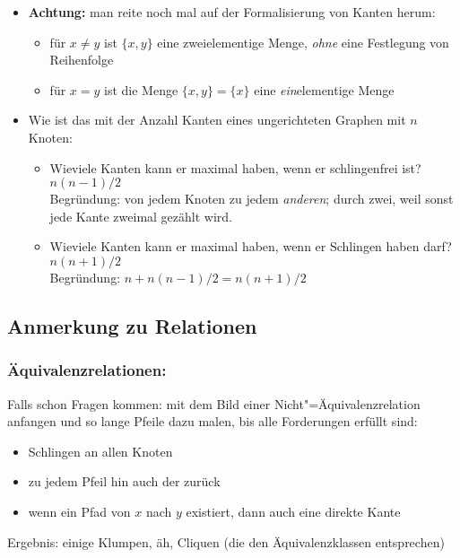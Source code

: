 \documentclass[12pt]{article}
\theoremstyle{margin}
\theoremstyle{margin}
\begin{document}
  \begin{itemize}
  \item \textbf{Achtung:} man reite noch mal auf der Formalisierung
    von Kanten herum:
    \begin{itemize}
    \item für $x\not=y$ ist $\{x,y\}$ eine zweielementige Menge,
      \emph{ohne} eine Festlegung von Reihenfolge
    \item für $x=y$ ist die Menge $\{x,y\}=\{x\}$ eine
      \emph{ein}elementige Menge
    \end{itemize}
  \item Wie ist das mit der Anzahl Kanten eines ungerichteten Graphen
    mit $n$ Knoten:
    \begin{itemize}
    \item Wieviele Kanten kann er maximal haben, wenn er schlingenfrei
      ist? $n(n-1)/2$\\
      Begründung: von jedem Knoten zu jedem
      \emph{anderen}; durch zwei, weil sonst jede Kante zweimal gezählt wird.
    \item Wieviele Kanten kann er maximal haben, wenn er Schlingen
      haben darf? $n(n+1)/2$ \\
      Begründung: $n+n(n-1)/2 = n(n+1)/2$
    \end{itemize}
  \end{itemize}

\subsection{Anmerkung zu Relationen}

\subsubsection{Äquivalenzrelationen:}

  Falls schon Fragen kommen: mit dem Bild einer
  Nicht"=Äquivalenzrelation anfangen und so lange Pfeile dazu malen,
  bis alle Forderungen erfüllt sind:
  \begin{itemize}
  \item Schlingen an allen Knoten
  \item zu jedem Pfeil hin auch der zurück
  \item wenn ein Pfad von $x$ nach $y$ existiert, dann auch eine
    direkte Kante
  \end{itemize}
  Ergebnis: einige Klumpen, äh, Cliquen (die den Äquivalenzklassen
  entsprechen)
\end{document}
